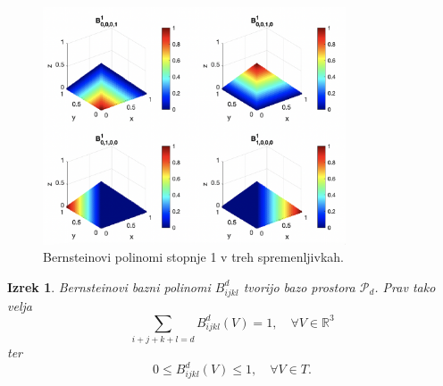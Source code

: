 \documentclass[11pt,a4paper]{article}
\newtheorem{theorem}{Izrek}
\begin{document}
\begin{figure}[ht]
    \centering
    \includegraphics[width=0.8\textwidth]{bernstein_d1.png}
    \caption{Bernsteinovi polinomi stopnje 1 v treh spremenljivkah.}
    \label{fig:bernstein}
\end{figure}

\begin{theorem}\label{izrek_bernstein}
    Bernsteinovi bazni polinomi $B_{ijkl}^d$ tvorijo bazo prostora $\mathcal{P}_d$.
    Prav tako velja 
    \begin{equation}\label{eq_partcija_enote}
        \sum_{i+j+k+l = d} B_{ijkl}^d(V) = 1, \quad \forall V \in \mathbb{R}^3     
    \end{equation}
    ter
    \begin{equation}
        0 \leq B_{ijkl}^d(V) \leq 1, \quad \forall V \in T.
    \end{equation}
\end{theorem}
\end{document}
